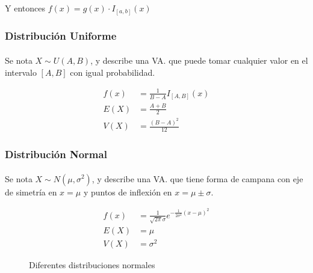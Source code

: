 \documentclass[../main.tex]{subfiles}
\begin{document}
Y entonces \(f(x) = g(x) \cdot I_{[a, b]}(x)\)

\subsubsection{Distribución Uniforme}

\paragraph{} Se nota \(X \sim U(A, B)\), y describe una VA. que puede tomar cualquier valor en el intervalo \([A, B]\) con igual probabilidad.

\begin{align*}
  f(x) &= \frac{1}{B-A}I_{[A, B]}(x) \\
  E(X) &= \frac{A+B}{2} \\
  V(X) &= \frac{(B - A)^{2}}{12}
\end{align*}

\subsubsection{Distribución Normal}

\paragraph{} Se nota \(X \sim N(\mu, \sigma^{2})\), y describe una VA. que tiene forma de campana con eje de simetría en \(x = \mu\) y puntos de inflexión en \(x = \mu \pm \sigma\).

\begin{align*}
  f(x) &= \frac{1}{\sqrt{2\pi}\sigma}e^{-\frac{1}{2\sigma^{2}}(x - \mu)^{2}} \\
  E(X) &= \mu \\
  V(X) &= \sigma^{2}
\end{align*}

\begin{figure}[H]
\center

  \caption{Diferentes distribuciones normales}
\end{figure}
\end{document}
